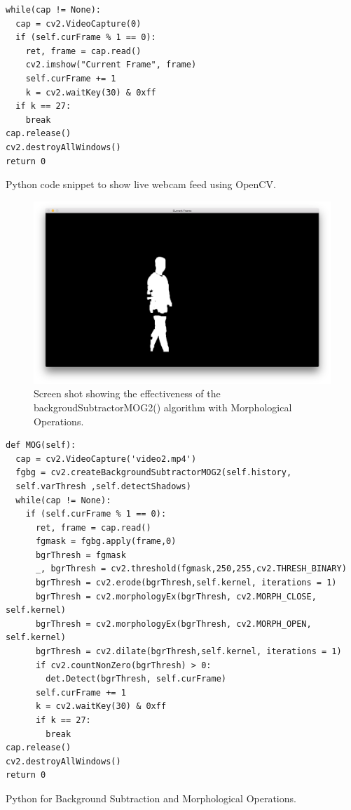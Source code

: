 \documentclass[11pt,a4paper]{report}
\begin{document}
\begin{listing}
\begin{verbatim}
while(cap != None):
  cap = cv2.VideoCapture(0)
  if (self.curFrame % 1 == 0):
    ret, frame = cap.read()
    cv2.imshow("Current Frame", frame)
    self.curFrame += 1
    k = cv2.waitKey(30) & 0xff
  if k == 27:
  	break
cap.release()
cv2.destroyAllWindows()
return 0
\end{verbatim}
\caption{Python code snippet to show live webcam feed using OpenCV.}
\label{displayInputVideo}
\end{listing}

\begin{figure}[H]
 \centering
 \includegraphics[scale = 0.22]{bgSubExample.png}
 \caption[Background Subtraction]{Screen shot showing the effectiveness of the backgroudSubtractorMOG2() algorithm with Morphological Operations.}
 \label{fig:backgroundSub}
\end{figure}

\begin{listing}
\begin{verbatim}
def MOG(self):
  cap = cv2.VideoCapture('video2.mp4')
  fgbg = cv2.createBackgroundSubtractorMOG2(self.history, 
  self.varThresh ,self.detectShadows)
  while(cap != None):
    if (self.curFrame % 1 == 0):
      ret, frame = cap.read()
      fgmask = fgbg.apply(frame,0)
      bgrThresh = fgmask
      _, bgrThresh = cv2.threshold(fgmask,250,255,cv2.THRESH_BINARY)
      bgrThresh = cv2.erode(bgrThresh,self.kernel, iterations = 1)
      bgrThresh = cv2.morphologyEx(bgrThresh, cv2.MORPH_CLOSE, self.kernel)
      bgrThresh = cv2.morphologyEx(bgrThresh, cv2.MORPH_OPEN, self.kernel)
      bgrThresh = cv2.dilate(bgrThresh,self.kernel, iterations = 1)
      if cv2.countNonZero(bgrThresh) > 0:
      	det.Detect(bgrThresh, self.curFrame)
      self.curFrame += 1
      k = cv2.waitKey(30) & 0xff
      if k == 27:
      	break
cap.release()
cv2.destroyAllWindows()
return 0
\end{verbatim}
\caption{Python for Background Subtraction and Morphological Operations.}
\label{bgSubPython}
\end{listing}
\end{document}
